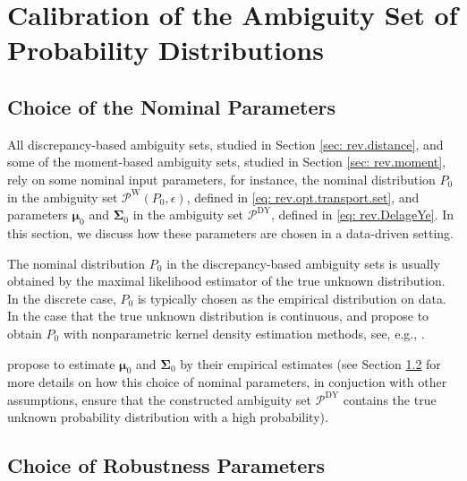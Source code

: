 \documentclass[final,onefignum,onetabnum]{class}
\newcommand{\bs}[1]{\boldsymbol{#1}} %
\newcommand{\Cs}[1]{\mathcal{#1}} %
\begin{document}
\section{Calibration of the Ambiguity Set of Probability Distributions}
\label{sec: rev.calibration}


\subsection{Choice of the Nominal Parameters}
All discrepancy-based ambiguity sets, studied in Section \ref{sec: rev.distance}, and some of the moment-based ambiguity sets, studied in Section \ref{sec: rev.moment}, rely on some nominal input parameters, for instance, the nominal distribution $P_{0}$  in the ambiguity set $\Cs{P}^{\text{W}}(P_{0}, \epsilon)$, defined in \eqref{eq: rev.opt.transport.set},  and parameters $\bs{\mu}_{0}$ and $\bs{\Sigma}_{0}$ in the  ambiguity set $\Cs{P}^{\text{DY}}$, defined in \eqref{eq: rev.DelageYe}.
In this section, we discuss how these parameters are chosen in a data-driven setting.

The nominal distribution $P_{0}$ in the  discrepancy-based ambiguity sets is usually obtained by the maximal likelihood estimator of the true unknown distribution. In the discrete case, $P_{0}$ is typically chosen as the empirical distribution on data. 
In the  case that the true unknown distribution is continuous, \citet{jiang2018} and \citet{zhao2015} propose to obtain $P_{0}$ with nonparametric kernel density estimation methods, see, e.g., \citet{devroye1985}. 

\citet{delage2010} propose to estimate $\bs{\mu}_{0}$ and $\bs{\Sigma}_{0}$ by their empirical estimates (see Section \ref{sec: rev.robustness_param} for more details on how this choice of nominal parameters, in conjuction with other assumptions, ensure that the constructed  ambiguity set $\Cs{P}^{\text{DY}}$ contains the true unknown probability distribution with a high probability). 

\subsection{Choice of Robustness Parameters}
\label{sec: rev.robustness_param}
\end{document}
